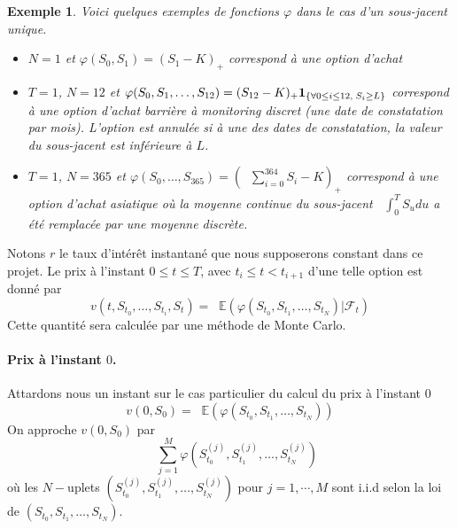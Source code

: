 \documentclass[a4paper,11pt]{article}
\def\cf{{\mathcal F}}
\def\E{{\mathbb E}}
\def\ind#1{{\bf 1}_{#1}}
\def\inv#1{\mathop{\frac{1}{ #1}}\nolimits}
\def\expp#1{\mathop {\mathrm{e}^{ #1}}}
\newtheorem*{ex}{Exemple}
\begin{document}
\begin{ex} Voici quelques exemples de fonctions $\varphi$ dans le cas d'un
  sous-jacent unique.
  \begin{itemize}
    \item $N=1$ et $\varphi(S_0, S_1) = (S_1 - K)_+$ correspond à une option
      d'achat
    \item $T = 1$, $N=12$  et $\varphi(S_0, S_1, \dots, S_{12}) = (S_{12} - K)_+
      \ind{\{\forall 0 \le i \le 12,\; S_i \ge L\}}$ correspond à une option
      d'achat barrière à monitoring discret (une date de constatation par mois).
      L'option est annulée si à une des dates de constatation, la valeur du
      sous-jacent est inférieure à $L$.
    \item $T=1$, $N=365$ et $\varphi(S_0, \dots, S_{365}) = (\inv{365}
      \sum_{i=0}^{364} S_i - K)_+$ correspond à une option d'achat asiatique où
      la moyenne continue du sous-jacent $\inv{T} \int_0^T S_u du$ a été
      remplacée par une moyenne discrète.
  \end{itemize}
\end{ex}
Notons $r$ le taux d'intérêt instantané que nous supposerons constant dans ce
projet. Le prix à l'instant $0 \le t \le T$, avec $t_i \le t < t_{i+1}$ d'une telle option
est donné par
\begin{equation*}
  v(t, S_{t_0}, \dots, S_{t_i}, S_t) = \expp{-r (T - t)} \E(\varphi(S_{t_0},
  S_{t_1}, \dots, S_{t_N}) | \cf_{t})
\end{equation*}
Cette quantité sera calculée par une méthode de Monte Carlo.

\paragraph{Prix à l'instant $0$.}

Attardons nous un instant sur le cas particulier du calcul du prix à l'instant $0$
\begin{equation*}
  v(0, S_{0}) = \expp{-r T} \E(\varphi(S_{t_0}, S_{t_1}, \dots, S_{t_N}))
\end{equation*}
On approche $v(0,S_0)$ par
\begin{equation*}
  \expp{-r T} \inv{M} \sum_{j=1}^M \varphi(S_{t_0}^{(j)}, S_{t_1}^{(j)}, \dots, S_{t_N}^{(j)})
\end{equation*}
où les $N-$uplets $(S_{t_0}^{(j)}, S_{t_1}^{(j)}, \dots, S_{t_N}^{(j)})$ pour
$j=1,\cdots,M$ sont i.i.d selon la loi de $(S_{t_0}, S_{t_1}, \dots, S_{t_N})$. \\
\end{document}
